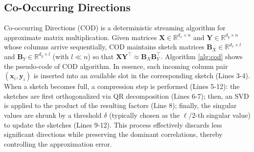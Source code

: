 \subsection{Co-Occurring Directions}


Co-occurring Directions (COD) \cite{MrouehMG17} is a deterministic streaming algorithm for approximate matrix multiplication. Given matrices \(\boldsymbol{X} \in \mathbb{R}^{d_x \times n}\) and \(\boldsymbol{Y} \in \mathbb{R}^{d_y \times n}\) whose columns arrive sequentially, COD maintains sketch matrices \(\boldsymbol{B}_X \in \mathbb{R}^{d_x \times l}\) and \(\boldsymbol{B}_Y \in \mathbb{R}^{d_y \times l}\) (with \(l \ll n\)) so that 
\(
\boldsymbol{X}\boldsymbol{Y}^\top \approx \boldsymbol{B}_X \boldsymbol{B}_Y^\top.
\)
Algorithm \ref{alg:cod} shows the pseudo-code of COD algorithm. In essence, each incoming column pair \((\boldsymbol{x}_i, \boldsymbol{y}_i)\) is inserted into an available slot in the corresponding sketch (Lines 3-4). When a sketch becomes full, a compression step is performed (Lines 5-12): the sketches are first orthogonalized via QR decomposition (Lines 6-7); then, an SVD is applied to the product of the resulting factors (Line 8); finally, the singular values are shrunk by a threshold \(\delta\) (typically chosen as the \(\ell/2\)-th singular value) to update the sketches (Lines 9-12). This process effectively discards less significant directions while preserving the dominant correlations, thereby controlling the approximation error. 

